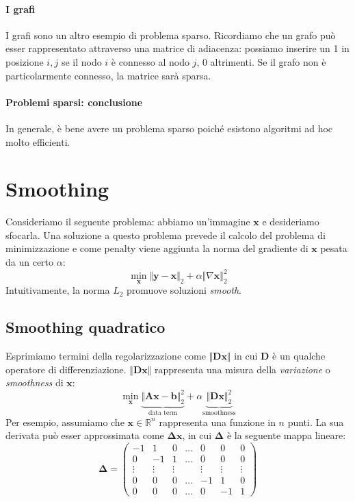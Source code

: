 \documentclass{article}
\begin{document}
            \paragraph{I grafi} I grafi sono un altro esempio di problema sparso. Ricordiamo che un grafo può esser rappresentato attraverso 
            una matrice di adiacenza: possiamo inserire un 1 in posizione $i,j$ se il nodo $i$ è connesso al nodo $j$, 0 altrimenti. 
            Se il grafo non è particolarmente connesso, la matrice sarà sparsa.
            
            \paragraph{Problemi sparsi: conclusione}In generale, è bene avere un problema sparso poiché esistono algoritmi ad hoc molto efficienti.

    \section{Smoothing}
        Consideriamo il seguente problema: abbiamo un'immagine $\mathbf{x}$ e desideriamo sfocarla. Una soluzione a questo problema 
        prevede il calcolo del problema di minimizzazione e come penalty viene aggiunta la norma del gradiente di $\mathbf{x}$ pesata 
        da un certo $\alpha$:
        \[ \min_\mathbf{x} \Vert \mathbf{y} - \mathbf{x} \Vert_2 + \alpha \Vert \nabla \mathbf{x} \Vert_2^2 \]
        Intuitivamente, la norma $L_2$ promuove soluzioni \emph{smooth}.
        \subsection{Smoothing quadratico}
            Esprimiamo termini della regolarizzazione come $\Vert \mathbf{Dx} \Vert$ in cui $\mathbf{D}$ è un qualche operatore di differenziazione. 
            $\Vert \mathbf{Dx} \Vert$ rappresenta una misura della \emph{variazione} o \emph{smoothness} di $\mathbf{x}$:
            \[\min_\mathbf{x} \underbrace{\Vert \mathbf{Ax} - \mathbf{b} \Vert_2^2}_\text{data term} + \alpha \underbrace{\Vert \mathbf{Dx} \Vert_2^2}_\text{smoothness}\]
            Per esempio, assumiamo che $\mathbf{x} \in \mathbb{R}^n$ rappresenta una funzione in $n$ punti. La sua derivata può esser 
            approssimata come $\mathbf{\Delta x}$, in cui $\mathbf{\Delta}$ è la seguente mappa lineare:
            \[\mathbf{\Delta} = \begin{pmatrix}
                -1 & 1 & 0 & \dots & 0 & 0 & 0 \\
                0 & -1 & 1 & \dots & 0 & 0 & 0 \\
                \vdots & \vdots & \vdots & & \vdots & \vdots & \vdots \\
                0 & 0 & 0 & \dots & -1 & 1 & 0 \\
                0 & 0 & 0 & \dots & 0 & -1 & 1
            \end{pmatrix}\]
\end{document}
